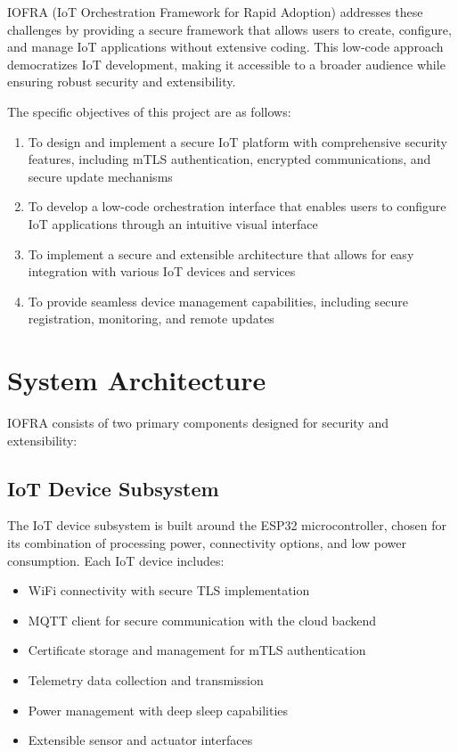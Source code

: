 \documentclass[conference]{IEEEtran}
\begin{document}
IOFRA (IoT Orchestration Framework for Rapid Adoption) addresses these challenges by providing a secure framework that allows users to create, configure, and manage IoT applications without extensive coding. This low-code approach democratizes IoT development, making it accessible to a broader audience while ensuring robust security and extensibility.

The specific objectives of this project are as follows:
\begin{enumerate}
    \item To design and implement a secure IoT platform with comprehensive security features, including mTLS authentication, encrypted communications, and secure update mechanisms
    \item To develop a low-code orchestration interface that enables users to configure IoT applications through an intuitive visual interface
    \item To implement a secure and extensible architecture that allows for easy integration with various IoT devices and services
    \item To provide seamless device management capabilities, including secure registration, monitoring, and remote updates
\end{enumerate}

\section{System Architecture}
IOFRA consists of two primary components designed for security and extensibility:

\subsection{IoT Device Subsystem}
The IoT device subsystem is built around the ESP32 microcontroller, chosen for its combination of processing power, connectivity options, and low power consumption. Each IoT device includes:

\begin{itemize}
    \item WiFi connectivity with secure TLS implementation
    \item MQTT client for secure communication with the cloud backend
    \item Certificate storage and management for mTLS authentication
    \item Telemetry data collection and transmission
    \item Power management with deep sleep capabilities
    \item Extensible sensor and actuator interfaces
\end{itemize}
\end{document}
